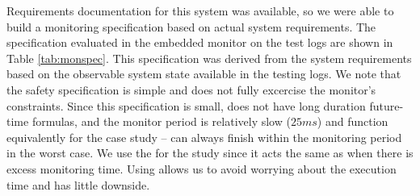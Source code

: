 Requirements documentation for this system was available, so we were able to build a monitoring specification based on actual system requirements.
The specification evaluated in the embedded monitor on the test logs are shown in Table \ref{tab:monspec}. This specification was derived from the system requirements based on the observable system state available in the testing logs.
We note that the safety specification is simple and does not fully excercise the monitor's constraints. 
%
Since this specification is small, does not have long duration future-time formulas,
and the monitor period is relatively slow ($25ms$) \ha and \monitor function equivalently for the case study -- \monitor can always finish within the monitoring period in the worst case.
%
We use the \ha for the study since it acts the same as \monitor when there is excess monitoring time.
Using \ha allows us to avoid worrying about the execution time and has little downside.


